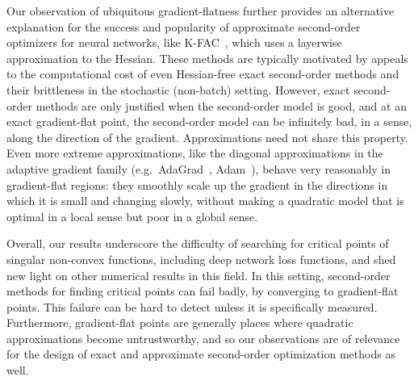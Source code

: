 \documentclass[../../thesis.tex]{subfiles}
\begin{document}
Our observation of ubiquitous gradient-flatness further
provides an alternative explanation
for the success and popularity
of approximate second-order optimizers for neural networks,
like K-FAC~\cite{martens2015},
which uses a layerwise approximation to the Hessian.
These methods are typically motivated by appeals to the computational cost
of even Hessian-free exact second-order methods
and their brittleness in the stochastic (non-batch) setting.
However, exact second-order methods are only justified
when the second-order model is good,
and at an exact gradient-flat point,
the second-order model can be infinitely bad,
in a sense, along the direction of the gradient.
Approximations need not share this property.
Even more extreme approximations,
like the diagonal approximations in the adaptive gradient family
(e.g.~AdaGrad~\cite{duchi2011}, Adam~\cite{kingma2014}),
behave very reasonably in gradient-flat regions:
they smoothly scale up the gradient in the directions in which
it is small and changing slowly,
without making a quadratic model that is optimal
in a local sense but poor in a global sense.

Overall, our results underscore the difficulty of searching
for critical points of singular non-convex functions,
including deep network loss functions,
and shed new light on other numerical results in this field.
In this setting, second-order methods for finding critical points can fail badly,
by converging to gradient-flat points.
This failure can be hard to detect unless it is specifically measured.
Furthermore, gradient-flat points are generally places where
quadratic approximations become untrustworthy,
and so our observations are of relevance for the
design of exact and approximate second-order optimization methods as well.

\onlyinsubfile{\printbibliography}
\end{document}
